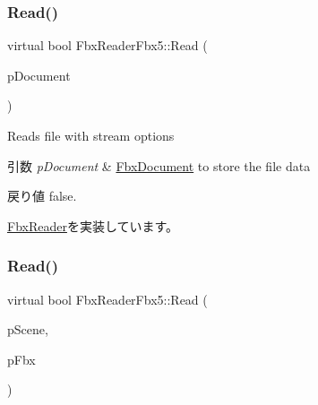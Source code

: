 \subsubsection{\texorpdfstring{Read()}{Read()}\hspace{0.1cm}{\footnotesize\ttfamily [1/2]}}
{\footnotesize\ttfamily virtual bool Fbx\+Reader\+Fbx5\+::\+Read (\begin{DoxyParamCaption}\item[{\hyperlink{class_fbx_document}{Fbx\+Document} $\ast$}]{p\+Document }\end{DoxyParamCaption})\hspace{0.3cm}{\ttfamily [virtual]}}

Reads file with stream options 
\begin{DoxyParams}{引数}
{\em p\+Document} & \hyperlink{class_fbx_document}{Fbx\+Document} to store the file data \\
\hline
\end{DoxyParams}
\begin{DoxyReturn}{戻り値}
{\ttfamily false}. 
\end{DoxyReturn}


\hyperlink{class_fbx_reader_a29941746acc73d7ffd2411a9be9d2525}{Fbx\+Reader}を実装しています。

\mbox{\label{class_fbx_reader_fbx5_a9f5142bf143ff9192bb7d687c831ad21}} 
\subsubsection{\texorpdfstring{Read()}{Read()}\hspace{0.1cm}{\footnotesize\ttfamily [2/2]}}
{\footnotesize\ttfamily virtual bool Fbx\+Reader\+Fbx5\+::\+Read (\begin{DoxyParamCaption}\item[{\hyperlink{class_fbx_scene}{Fbx\+Scene} \&}]{p\+Scene,  }\item[{\hyperlink{class_fbx_i_o}{Fbx\+IO} $\ast$}]{p\+Fbx }\end{DoxyParamCaption})\hspace{0.3cm}{\ttfamily [virtual]}}

\mbox{\label{class_fbx_reader_fbx5_ab910914828f297f51c28d88f466d6928}} 
